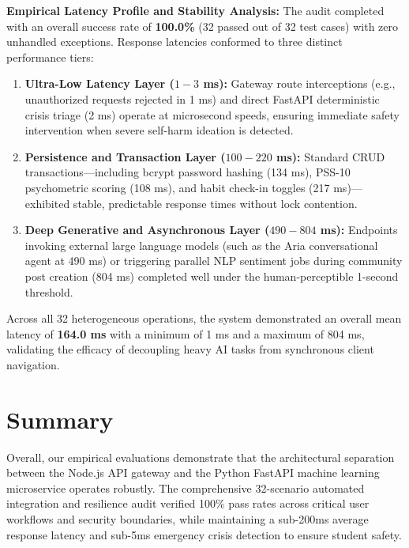 \noindent \textbf{Empirical Latency Profile and Stability Analysis:} 
The audit completed with an overall success rate of \textbf{100.0\%} (32 passed out of 32 test cases) with zero unhandled exceptions. Response latencies conformed to three distinct performance tiers:
\begin{enumerate}
    \item \textbf{Ultra-Low Latency Layer ($1 - 3$ ms):} Gateway route interceptions (e.g., unauthorized requests rejected in 1 ms) and direct FastAPI deterministic crisis triage (2 ms) operate at microsecond speeds, ensuring immediate safety intervention when severe self-harm ideation is detected.
    \item \textbf{Persistence and Transaction Layer ($100 - 220$ ms):} Standard CRUD transactions---including bcrypt password hashing (134 ms), PSS-10 psychometric scoring (108 ms), and habit check-in toggles (217 ms)---exhibited stable, predictable response times without lock contention.
    \item \textbf{Deep Generative and Asynchronous Layer ($490 - 804$ ms):} Endpoints invoking external large language models (such as the Aria conversational agent at 490 ms) or triggering parallel NLP sentiment jobs during community post creation (804 ms) completed well under the human-perceptible 1-second threshold.
\end{enumerate}
Across all 32 heterogeneous operations, the system demonstrated an overall mean latency of \textbf{164.0 ms} with a minimum of 1 ms and a maximum of 804 ms, validating the efficacy of decoupling heavy AI tasks from synchronous client navigation.

\section{Summary}
Overall, our empirical evaluations demonstrate that the architectural separation between the Node.js API gateway and the Python FastAPI machine learning microservice operates robustly. The comprehensive 32-scenario automated integration and resilience audit verified 100\% pass rates across critical user workflows and security boundaries, while maintaining a sub-200ms average response latency and sub-5ms emergency crisis detection to ensure student safety.
